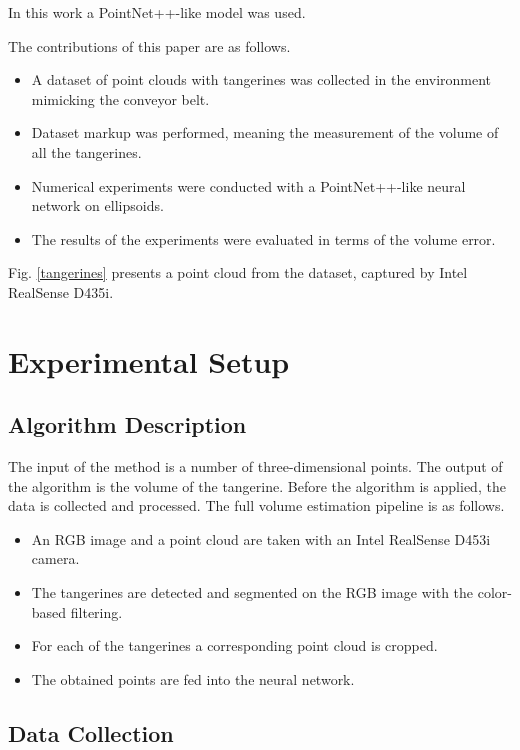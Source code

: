 \begin{thebibliography}{12}
In this work a PointNet++-like model was used.

The contributions of this paper are as follows.
\begin{itemize}
    \item A dataset of point clouds with tangerines was collected in the environment mimicking the conveyor belt.
    \item Dataset markup was performed, meaning the measurement of the volume of all the tangerines.
    \item Numerical experiments were conducted with a PointNet++-like neural network on ellipsoids.
    \item The results of the experiments were evaluated in terms of the volume error.
\end{itemize}

Fig. \ref{tangerines} presents a point cloud from the dataset, captured by Intel RealSense D435i.
 
\section{Experimental Setup}

\subsection{Algorithm Description}

The input of the method is a number of three-dimensional points.
The output of the algorithm is the volume of the tangerine.
Before the algorithm is applied, the data is collected and processed.
The full volume estimation pipeline is as follows.

\begin{itemize}
    \item An RGB image and a point cloud are taken with an Intel RealSense D453i camera.
    \item The tangerines are detected and segmented on the RGB image with the color-based filtering.
    \item For each of the tangerines a corresponding point cloud is cropped.
    \item The obtained points are fed into the neural network.
\end{itemize}

\subsection{Data Collection}


\end{thebibliography}
